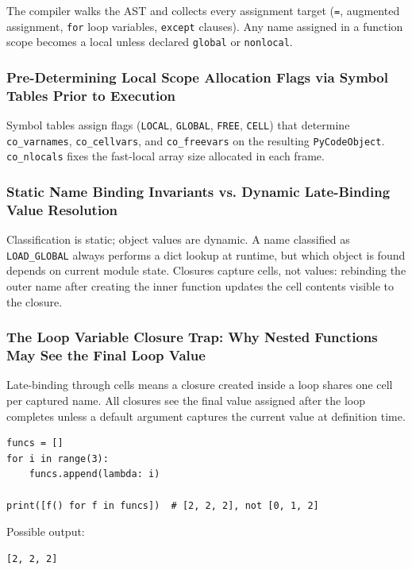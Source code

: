 \documentclass[a4paper,twoside]{report}
\begin{document}
The compiler walks the AST and collects every assignment target (\texttt{=}, augmented assignment, \texttt{for} loop variables, \texttt{except} clauses). Any name assigned in a function scope becomes a local unless declared \texttt{global} or \texttt{nonlocal}.

\subsubsection{Pre-Determining Local Scope Allocation Flags via Symbol Tables Prior to Execution}

Symbol tables assign flags (\texttt{LOCAL}, \texttt{GLOBAL}, \texttt{FREE}, \texttt{CELL}) that determine \texttt{co\_varnames}, \texttt{co\_cellvars}, and \texttt{co\_freevars} on the resulting \texttt{PyCodeObject}. \texttt{co\_nlocals} fixes the fast-local array size allocated in each frame.

\subsubsection{Static Name Binding Invariants vs. Dynamic Late-Binding Value Resolution}

Classification is static; object values are dynamic. A name classified as \texttt{LOAD\_GLOBAL} always performs a dict lookup at runtime, but which object is found depends on current module state. Closures capture cells, not values: rebinding the outer name after creating the inner function updates the cell contents visible to the closure.

\subsubsection{The Loop Variable Closure Trap: Why Nested Functions May See the Final Loop Value}

Late-binding through cells means a closure created inside a loop shares one cell per captured name. All closures see the final value assigned after the loop completes unless a default argument captures the current value at definition time.

\begin{verbatim}
funcs = []
for i in range(3):
    funcs.append(lambda: i)

print([f() for f in funcs])  # [2, 2, 2], not [0, 1, 2]
\end{verbatim}

Possible output:

\begin{verbatim}
[2, 2, 2]
\end{verbatim}
\end{document}
